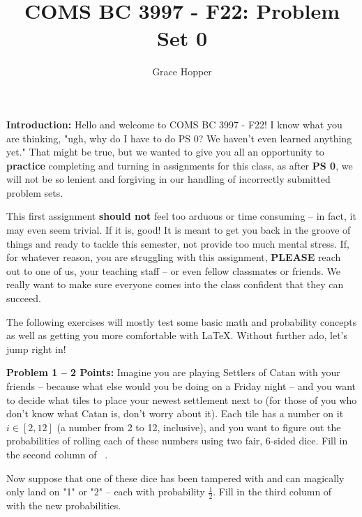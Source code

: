 \documentclass[]{article}
\title{COMS BC 3997 - F22: Problem Set 0}
\author{Grace Hopper}
\date{}
\begin{document}
\maketitle

\textbf{Introduction:}  
Hello and welcome to COMS BC 3997 - F22!  I know what you are thinking, "ugh, why do I have to do PS 0?  We haven't even learned anything yet."  That might be true, but we wanted to give you all an opportunity to \textbf{practice} completing and turning in assignments for this class, as after \textbf{PS 0}, we will not be so lenient and forgiving in our handling of incorrectly submitted problem sets.

This first assignment \textbf{should not} feel too arduous or time consuming -- in fact, it may even seem trivial.  If it is, good!  It is meant to get you back in the groove of things and ready to tackle this semester, not provide too much mental stress.  If, for whatever reason, you are struggling with this assignment, \textbf{PLEASE} reach out to one of us, your teaching staff -- or even fellow classmates or friends.  We really want to make sure everyone comes into the class confident that they can succeed.

The following exercises will mostly test some basic math and probability concepts as well as getting you more comfortable with \LaTeX. Without further ado, let's jump right in!

\clearpage
\textbf{Problem 1 -- 2 Points:}
Imagine you are playing Settlers of Catan with your friends -- because what else would you be doing on a Friday night -- and you want to decide what tiles to place your newest settlement next to (for those of you who don't know what Catan is, don't worry about it).  Each tile has a number on it $i \in [2,12]$ (a number from 2 to 12, inclusive), and you want to figure out the probabilities of rolling each of these numbers using two fair, 6-sided dice.  Fill in the second column of ~.

Now suppose that one of these dice has been tampered with and can magically only land on "1" or "2" -- each with probability $\frac{1}{2}$.  Fill in the third column of ~ with the new probabilities.
\end{document}
